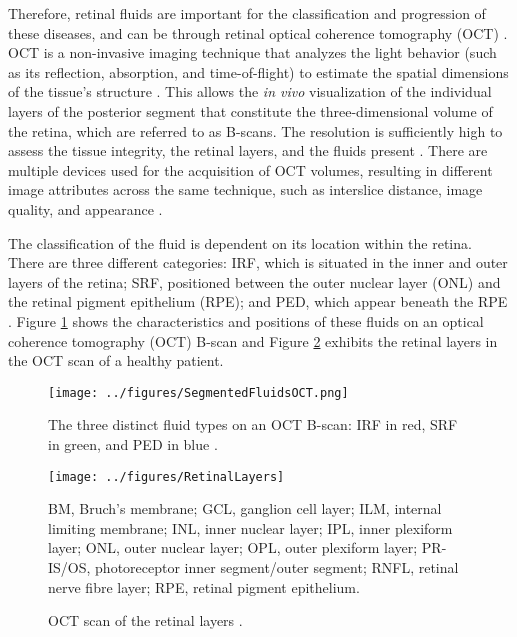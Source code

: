 Therefore, retinal fluids are important for the classification and progression of these diseases, and can be through retinal optical coherence tomography (OCT) \parencite{Bogunovic2019a}. OCT is a non-invasive imaging technique that analyzes the light behavior (such as its reflection, absorption, and time-of-flight) to estimate the spatial dimensions of the tissue's structure \parencite{Huang1991}. This allows the \textit{in vivo} visualization of the individual layers of the posterior segment that constitute the three-dimensional volume of the retina, which are referred to as B-scans. The resolution is sufficiently high to assess the tissue integrity, the retinal layers, and the fluids present \parencite{Drexler2008, Viedma2022}. There are multiple devices used for the acquisition of OCT volumes, resulting in different image attributes across the same technique, such as interslice distance, image quality, and appearance \parencite{Bogunovic2019a}. 
\par
The classification of the fluid is dependent on its location within the retina. There are three different categories: IRF, which is situated in the inner and outer layers of the retina; SRF, positioned between the outer nuclear layer (ONL) and the retinal pigment epithelium (RPE); and PED, which appear beneath the RPE \parencite{Bogunovic2019a}. Figure \ref{fig:SegmentedFluidsOCT} shows the characteristics and positions of these fluids on an optical coherence tomography (OCT) B-scan and Figure \ref{fig:RetinalLayers} exhibits the retinal layers in the OCT scan of a healthy patient.
\par
\begin{figure}[!ht]
	\centering
	\texttt{[image: ../figures/SegmentedFluidsOCT.png]}
	\caption{The three distinct fluid types on an OCT B-scan: IRF in red, SRF in green, and PED in blue \cite{Bogunovic2019a}.}
	\label{fig:SegmentedFluidsOCT}
\end{figure}
\begin{figure}[!ht]
	\centering
	\texttt{[image: ../figures/RetinalLayers]}
	\caption{OCT scan of the retinal layers \cite{Almonte2020}.}
	\label{fig:RetinalLayers}
	\footnotesize
	\justifying
	BM, Bruch's membrane; GCL, ganglion cell layer; ILM, internal limiting membrane; INL, inner nuclear layer; IPL, inner plexiform layer; ONL, outer nuclear layer; OPL, outer plexiform layer; PR-IS/OS, photoreceptor inner segment/outer segment; RNFL, retinal nerve fibre layer; RPE, retinal pigment epithelium.
\end{figure}
